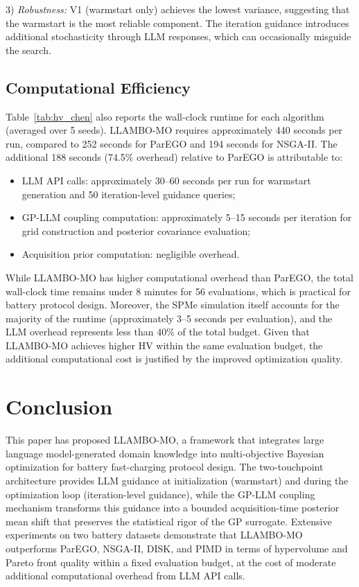 \documentclass[lettersize,journal]{IEEEtran}
\begin{document}
3) \textit{Robustness:} V1 (warmstart only) achieves the lowest variance, suggesting that the warmstart is the most reliable component. The iteration guidance introduces additional stochasticity through LLM responses, which can occasionally misguide the search.

\subsection{Computational Efficiency}

Table~\ref{tab:hv_chen} also reports the wall-clock runtime for each algorithm (averaged over 5 seeds). LLAMBO-MO requires approximately 440 seconds per run, compared to 252 seconds for ParEGO and 194 seconds for NSGA-II. The additional 188 seconds (74.5\% overhead) relative to ParEGO is attributable to:
\begin{itemize}
\item LLM API calls: approximately 30--60 seconds per run for warmstart generation and 50 iteration-level guidance queries;
\item GP-LLM coupling computation: approximately 5--15 seconds per iteration for grid construction and posterior covariance evaluation;
\item Acquisition prior computation: negligible overhead.
\end{itemize}

While LLAMBO-MO has higher computational overhead than ParEGO, the total wall-clock time remains under 8 minutes for 56 evaluations, which is practical for battery protocol design. Moreover, the SPMe simulation itself accounts for the majority of the runtime (approximately 3--5 seconds per evaluation), and the LLM overhead represents less than 40\% of the total budget. Given that LLAMBO-MO achieves higher HV within the same evaluation budget, the additional computational cost is justified by the improved optimization quality.

\section{Conclusion}

This paper has proposed LLAMBO-MO, a framework that integrates large language model-generated domain knowledge into multi-objective Bayesian optimization for battery fast-charging protocol design. The two-touchpoint architecture provides LLM guidance at initialization (warmstart) and during the optimization loop (iteration-level guidance), while the GP-LLM coupling mechanism transforms this guidance into a bounded acquisition-time posterior mean shift that preserves the statistical rigor of the GP surrogate. Extensive experiments on two battery datasets demonstrate that LLAMBO-MO outperforms ParEGO, NSGA-II, DISK, and PIMD in terms of hypervolume and Pareto front quality within a fixed evaluation budget, at the cost of moderate additional computational overhead from LLM API calls.
\end{document}
